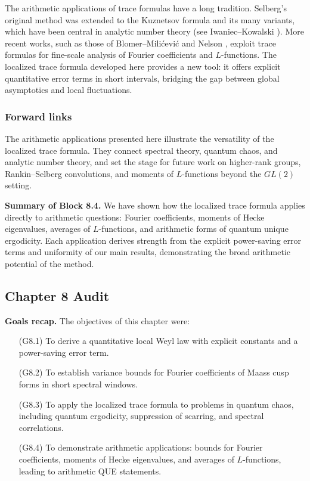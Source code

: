 The arithmetic applications of trace formulas have a long tradition. Selberg’s original method \cite{Selberg1956} was extended to the Kuznetsov formula and its many variants, which have been central in analytic number theory (see Iwaniec–Kowalski \cite{IwaniecKowalski2004}). More recent works, such as those of Blomer–Milićević \cite{BlomerMilicevic2015} and Nelson \cite{Nelson2015}, exploit trace formulas for fine-scale analysis of Fourier coefficients and $L$-functions. The localized trace formula developed here provides a new tool: it offers explicit quantitative error terms in short intervals, bridging the gap between global asymptotics and local fluctuations.

\subsubsection{Forward links}

The arithmetic applications presented here illustrate the versatility of the localized trace formula. They connect spectral theory, quantum chaos, and analytic number theory, and set the stage for future work on higher-rank groups, Rankin–Selberg convolutions, and moments of $L$-functions beyond the $GL(2)$ setting.

\medskip

\noindent\textbf{Summary of Block 8.4.}  
We have shown how the localized trace formula applies directly to arithmetic questions: Fourier coefficients, moments of Hecke eigenvalues, averages of $L$-functions, and arithmetic forms of quantum unique ergodicity. Each application derives strength from the explicit power-saving error terms and uniformity of our main results, demonstrating the broad arithmetic potential of the method.

\subsection*{Chapter 8 Audit}

\noindent\textbf{Goals recap.}  
The objectives of this chapter were:

\begin{itemize}
  \item[(G8.1)] To derive a quantitative local Weyl law with explicit constants and a power-saving error term.  
  \item[(G8.2)] To establish variance bounds for Fourier coefficients of Maass cusp forms in short spectral windows.  
  \item[(G8.3)] To apply the localized trace formula to problems in quantum chaos, including quantum ergodicity, suppression of scarring, and spectral correlations.  
  \item[(G8.4)] To demonstrate arithmetic applications: bounds for Fourier coefficients, moments of Hecke eigenvalues, and averages of $L$-functions, leading to arithmetic QUE statements.  
\end{itemize}

